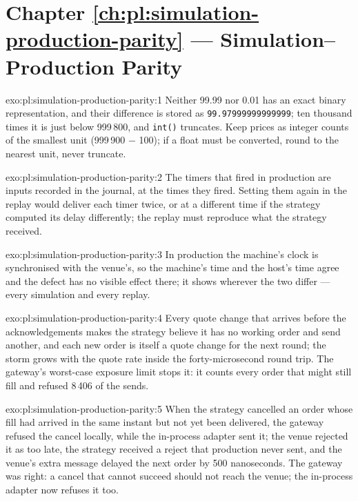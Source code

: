 \section*{Chapter \ref{ch:pl:simulation-production-parity} --- Simulation--Production Parity}

\begin{solution}{exo:pl:simulation-production-parity:1}
Neither 99.99 nor 0.01 has an exact binary representation, and their difference is stored as
\texttt{99.97999999999999}; ten thousand times it is just
below 999\,800, and \texttt{int()} truncates. Keep prices as integer counts of the smallest unit (999\,900 $-$ 100); if a float must be
converted, round to the nearest unit, never truncate.
\end{solution}

\begin{solution}{exo:pl:simulation-production-parity:2}
The timers that fired in production are inputs recorded in the journal, at the times they fired. Setting them again in the replay would
deliver each timer twice, or at a different time if the strategy computed its delay differently; the replay must reproduce what the
strategy received.
\end{solution}

\begin{solution}{exo:pl:simulation-production-parity:3}
In production the machine's clock is synchronised with the venue's, so the machine's time and the host's time agree and the defect has no
visible effect there; it shows wherever the two differ --- every simulation and every replay.
\end{solution}

\begin{solution}{exo:pl:simulation-production-parity:4}
Every quote change that arrives before the acknowledgements makes the strategy believe it has no working order and send another, and each
new order is itself a quote change for the next round; the storm grows with the quote rate inside the forty-microsecond round trip. The
gateway's worst-case exposure limit stops it: it counts every order that might still fill and refused 8\,406 of the sends.
\end{solution}

\begin{solution}{exo:pl:simulation-production-parity:5}
When the strategy cancelled an order whose fill had arrived in the same instant but not yet been delivered, the gateway refused the cancel
locally, while the in-process adapter sent it; the venue rejected it as too late, the strategy received a reject that production never
sent, and the venue's extra message delayed the next order by 500 nanoseconds. The gateway was right: a cancel that cannot succeed should
not reach the venue; the in-process adapter now refuses it too.
\end{solution}

